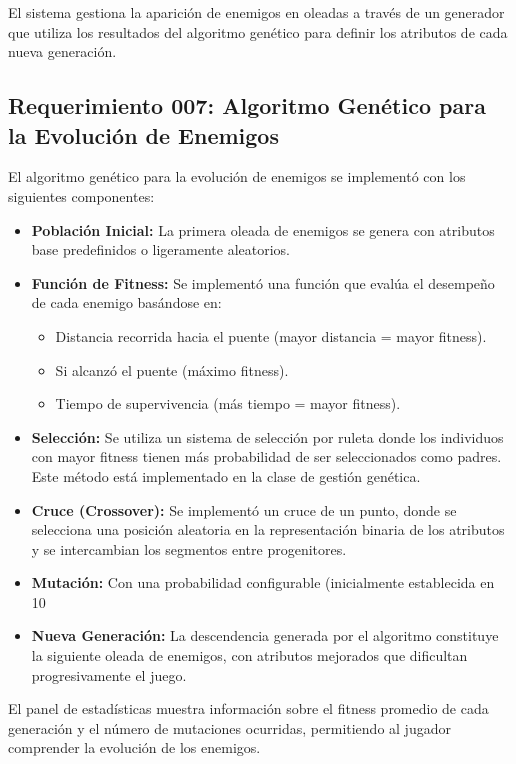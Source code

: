 \documentclass[a4paper,num-refs]{oup-contemporary}
\begin{document}
El sistema gestiona la aparición de enemigos en oleadas a través de un generador que utiliza los resultados del algoritmo genético para definir los atributos de cada nueva generación.

\subsection{Requerimiento 007: Algoritmo Genético para la Evolución de Enemigos}
El algoritmo genético para la evolución de enemigos se implementó con los siguientes componentes:

\begin{itemize}
    \item \textbf{Población Inicial:} La primera oleada de enemigos se genera con atributos base predefinidos o ligeramente aleatorios.
    \item \textbf{Función de Fitness:} Se implementó una función que evalúa el desempeño de cada enemigo basándose en:
    \begin{itemize}
        \item Distancia recorrida hacia el puente (mayor distancia = mayor fitness).
        \item Si alcanzó el puente (máximo fitness).
        \item Tiempo de supervivencia (más tiempo = mayor fitness).
    \end{itemize}
    \item \textbf{Selección:} Se utiliza un sistema de selección por ruleta donde los individuos con mayor fitness tienen más probabilidad de ser seleccionados como padres. Este método está implementado en la clase de gestión genética.
    \item \textbf{Cruce (Crossover):} Se implementó un cruce de un punto, donde se selecciona una posición aleatoria en la representación binaria de los atributos y se intercambian los segmentos entre progenitores.
    \item \textbf{Mutación:} Con una probabilidad configurable (inicialmente establecida en 10%
    \item \textbf{Nueva Generación:} La descendencia generada por el algoritmo constituye la siguiente oleada de enemigos, con atributos mejorados que dificultan progresivamente el juego.
\end{itemize}

El panel de estadísticas muestra información sobre el fitness promedio de cada generación y el número de mutaciones ocurridas, permitiendo al jugador comprender la evolución de los enemigos.
\end{document}
